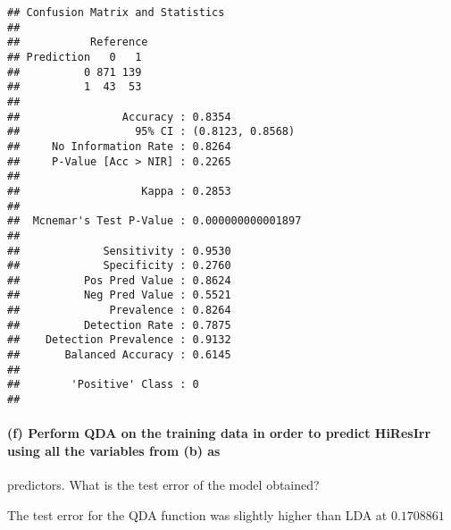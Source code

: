 \documentclass[]{article}
\newenvironment{Shaded}{\begin{snugshade}}{\end{snugshade}}
\newcommand{\DataTypeTok}[1]{\textcolor[rgb]{0.13,0.29,0.53}{#1}}
\newcommand{\KeywordTok}[1]{\textcolor[rgb]{0.13,0.29,0.53}{\textbf{#1}}}
\newcommand{\NormalTok}[1]{#1}
\newcommand{\OperatorTok}[1]{\textcolor[rgb]{0.81,0.36,0.00}{\textbf{#1}}}
\newcommand{\StringTok}[1]{\textcolor[rgb]{0.31,0.60,0.02}{#1}}
\let\oldparagraph\paragraph
\renewcommand{\paragraph}[1]{\oldparagraph{#1}\mbox{}}
\begin{document}
\begin{verbatim}
## Confusion Matrix and Statistics
## 
##           Reference
## Prediction   0   1
##          0 871 139
##          1  43  53
##                                            
##                Accuracy : 0.8354           
##                  95% CI : (0.8123, 0.8568) 
##     No Information Rate : 0.8264           
##     P-Value [Acc > NIR] : 0.2265           
##                                            
##                   Kappa : 0.2853           
##                                            
##  Mcnemar's Test P-Value : 0.000000000001897
##                                            
##             Sensitivity : 0.9530           
##             Specificity : 0.2760           
##          Pos Pred Value : 0.8624           
##          Neg Pred Value : 0.5521           
##              Prevalence : 0.8264           
##          Detection Rate : 0.7875           
##    Detection Prevalence : 0.9132           
##       Balanced Accuracy : 0.6145           
##                                            
##        'Positive' Class : 0                
## 
\end{verbatim}

\hypertarget{f-perform-qda-on-the-training-data-in-order-to-predict-hiresirr-using-all-the-variables-from-b-as}{%
\paragraph{(f) Perform QDA on the training data in order to predict
HiResIrr using all the variables from (b)
as}\label{f-perform-qda-on-the-training-data-in-order-to-predict-hiresirr-using-all-the-variables-from-b-as}}

predictors. What is the test error of the model obtained?

The test error for the QDA function was slightly higher than LDA at
\(0.1708861\)

\begin{Shaded}
\end{Shaded}
\end{document}
